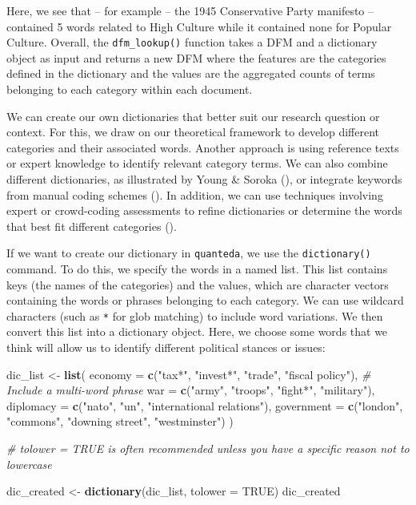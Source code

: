 \documentclass[
]{book}
\newenvironment{Shaded}{\begin{snugshade}}{\end{snugshade}}
\newcommand{\AttributeTok}[1]{\textcolor[rgb]{0.13,0.29,0.53}{#1}}
\newcommand{\CommentTok}[1]{\textcolor[rgb]{0.56,0.35,0.01}{\textit{#1}}}
\newcommand{\ConstantTok}[1]{\textcolor[rgb]{0.56,0.35,0.01}{#1}}
\newcommand{\FunctionTok}[1]{\textcolor[rgb]{0.13,0.29,0.53}{\textbf{#1}}}
\newcommand{\NormalTok}[1]{#1}
\newcommand{\OtherTok}[1]{\textcolor[rgb]{0.56,0.35,0.01}{#1}}
\newcommand{\StringTok}[1]{\textcolor[rgb]{0.31,0.60,0.02}{#1}}
\begin{document}
Here, we see that -- for example -- the 1945 Conservative Party manifesto -- contained 5 words related to High Culture while it contained none for Popular Culture. Overall, the \texttt{dfm\_lookup()} function takes a DFM and a dictionary object as input and returns a new DFM where the features are the categories defined in the dictionary and the values are the aggregated counts of terms belonging to each category within each document.

We can create our own dictionaries that better suit our research question or context. For this, we draw on our theoretical framework to develop different categories and their associated words. Another approach is using reference texts or expert knowledge to identify relevant category terms. We can also combine different dictionaries, as illustrated by Young \& Soroka (), or integrate keywords from manual coding schemes (). In addition, we can use techniques involving expert or crowd-coding assessments to refine dictionaries or determine the words that best fit different categories ().

If we want to create our dictionary in \texttt{quanteda}, we use the \texttt{dictionary()} command. To do this, we specify the words in a named list. This list contains keys (the names of the categories) and the values, which are character vectors containing the words or phrases belonging to each category. We can use wildcard characters (such as \texttt{*} for glob matching) to include word variations. We then convert this list into a dictionary object. Here, we choose some words that we think will allow us to identify different political stances or issues:

\begin{Shaded}
\begin{Highlighting}[]
\NormalTok{dic\_list }\OtherTok{\textless{}{-}} \FunctionTok{list}\NormalTok{(}
    \AttributeTok{economy =} \FunctionTok{c}\NormalTok{(}\StringTok{"tax*"}\NormalTok{, }\StringTok{"invest*"}\NormalTok{, }\StringTok{"trade"}\NormalTok{, }\StringTok{"fiscal policy"}\NormalTok{), }\CommentTok{\# Include a multi{-}word phrase}
    \AttributeTok{war =} \FunctionTok{c}\NormalTok{(}\StringTok{"army"}\NormalTok{, }\StringTok{"troops"}\NormalTok{, }\StringTok{"fight*"}\NormalTok{, }\StringTok{"military"}\NormalTok{),}
    \AttributeTok{diplomacy =} \FunctionTok{c}\NormalTok{(}\StringTok{"nato"}\NormalTok{, }\StringTok{"un"}\NormalTok{, }\StringTok{"international relations"}\NormalTok{), }
    \AttributeTok{government =} \FunctionTok{c}\NormalTok{(}\StringTok{"london"}\NormalTok{, }\StringTok{"commons"}\NormalTok{, }\StringTok{"downing street"}\NormalTok{, }\StringTok{"westminster"}\NormalTok{)}
\NormalTok{)}

\CommentTok{\# tolower = TRUE is often recommended unless you have a specific reason not to lowercase}

\NormalTok{dic\_created }\OtherTok{\textless{}{-}} \FunctionTok{dictionary}\NormalTok{(dic\_list, }\AttributeTok{tolower =} \ConstantTok{TRUE}\NormalTok{)}
\NormalTok{dic\_created}
\end{Highlighting}
\end{Shaded}
\end{document}
